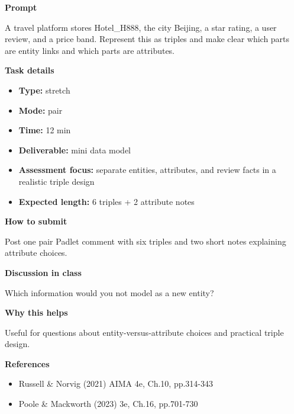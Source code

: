 \documentclass[11pt]{article}
\begin{document}
\begin{tcolorbox}[colback=white,colframe=MidnightBlue,title={Q4 Stretch Extension},fonttitle=\bfseries,breakable]
\begin{center}
\end{center}

{\large\bfseries\color{MidnightBlue} Prompt}\par\medskip
A travel platform stores Hotel\_H888, the city Beijing, a star rating, a user review, and a price band. Represent this as triples and make clear which parts are entity links and which parts are attributes.

{\large\bfseries\color{MidnightBlue} Task details}\par\medskip
\begin{itemize}\item \textbf{Type:} stretch
\item \textbf{Mode:} pair
\item \textbf{Time:} 12 min
\item \textbf{Deliverable:} mini data model
\item \textbf{Assessment focus:} separate entities, attributes, and review facts in a realistic triple design
\item \textbf{Expected length:} 6 triples + 2 attribute notes\end{itemize}

{\large\bfseries\color{MidnightBlue} How to submit}\par\medskip
Post one pair Padlet comment with six triples and two short notes explaining attribute choices.

{\large\bfseries\color{MidnightBlue} Discussion in class}\par\medskip
Which information would you not model as a new entity?

{\large\bfseries\color{MidnightBlue} Why this helps}\par\medskip
Useful for questions about entity-versus-attribute choices and practical triple design.

{\large\bfseries\color{MidnightBlue} References}\par\medskip
\begin{itemize}\item Russell \& Norvig (2021) AIMA 4e, Ch.10, pp.314-343
\item Poole \& Mackworth (2023) 3e, Ch.16, pp.701-730\end{itemize}
\end{tcolorbox}
\end{document}
